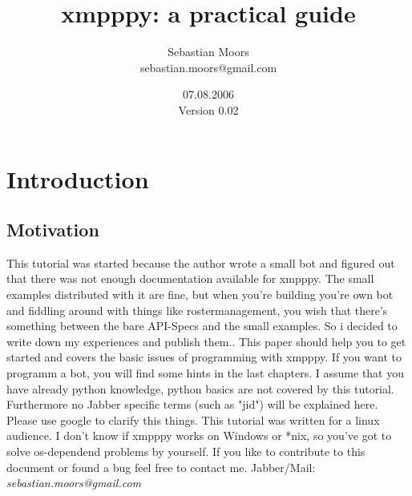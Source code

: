 \documentclass[a4paper,10pt]{report}
\title{xmpppy: a practical guide}
\author{Sebastian Moors \\ sebastian.moors@gmail.com}
\date{07.08.2006 \\[1cm] Version 0.02}
\begin{document}
\begin{titlepage}
\maketitle


\end{titlepage}
\tableofcontents
\newpage




\chapter{Introduction}
\section{Motivation}
This tutorial was started because the author wrote a small bot and figured out that there was not enough documentation available for xmpppy. The small examples distributed with it are fine, but when you're building you're own bot and fiddling around with things like rostermanagement, you wish that there's something between the bare API-Specs and the small examples. So i decided to write down my experiences and publish them..
\newline
This paper should help you to get started and covers the basic issues of programming with xmpppy.
If you want to programm a bot, you will find some hints in the last chapters.
I assume that you have already python knowledge, python basics are not covered by this tutorial.
\newline
\newline
Furthermore no Jabber specific terms (such as "jid") will be explained here. Please use google to clarify this things.
\newline
\newline
This tutorial was written for a linux audience. I don't know if xmpppy works on Windows or *nix, so you've got to solve os-dependend problems by yourself.
\newline
\newline
If you like to contribute to this document or found a bug feel free to contact me.
\newline
\newline Jabber/Mail: \textit{sebastian.moors@gmail.com}
\end{document}
